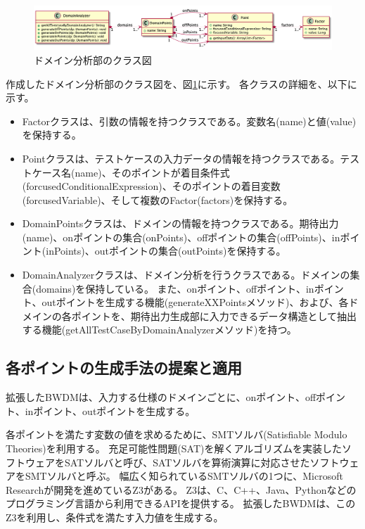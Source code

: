 \documentclass[uplatex, report, a4j, 10pt]{jsbook}
\begin{document}
\begin{figure}[t]
  \begin{center}
    \includegraphics[keepaspectratio, width=160mm]{figs/DomainAnalyzer.png}
    \caption{ドメイン分析部のクラス図}
    \label{fig:class_DomainAnalyzer}
  \end{center}
\end{figure}

作成したドメイン分析部のクラス図を、図\ref{fig:class_DomainAnalyzer}に示す。
各クラスの詳細を、以下に示す。

\begin{itemize}
  \item
        Factorクラスは、引数の情報を持つクラスである。変数名(name)と値(value)を保持する。
  \item
        Pointクラスは、テストケースの入力データの情報を持つクラスである。テストケース名(name)、そのポイントが着目条件式(forcusedConditionalExpression)、そのポイントの着目変数(forcusedVariable)、そして複数のFactor(factors)を保持する。
  \item
        DomainPointsクラスは、ドメインの情報を持つクラスである。期待出力(name)、onポイントの集合(onPoints)、offポイントの集合(offPoints)、inポイント(inPoints)、outポイントの集合(outPoints)を保持する。
  \item
        DomainAnalyzerクラスは、ドメイン分析を行うクラスである。ドメインの集合(domains)を保持している。
        また、onポイント、offポイント、inポイント、outポイントを生成する機能(generateXXPointsメソッド)、および、各ドメインの各ポイントを、期待出力生成部に入力できるデータ構造として抽出する機能(getAllTestCaseByDomainAnalyzerメソッド)を持つ。

\end{itemize}

\subsection{各ポイントの生成手法の提案と適用}\label{cha:create_point}
拡張したBWDMは、入力する仕様のドメインごとに、onポイント、offポイント、inポイント、outポイントを生成する。

各ポイントを満たす変数の値を求めるために、SMTソルバ(Satisfiable Modulo Theories)\cite{sat}を利用する。
充足可能性問題(SAT)を解くアルゴリズムを実装したソフトウェアをSATソルバと呼び、SATソルバを算術演算に対応させたソフトウェアをSMTソルバと呼ぶ。
幅広く知られているSMTソルバの1つに、Microsoft Researchが開発を進めているZ3\cite{z3}がある。
Z3は、C、C++、Java、Pythonなどのプログラミング言語から利用できるAPIを提供する。
拡張したBWDMは、このZ3を利用し、条件式を満たす入力値を生成する。
\end{document}
